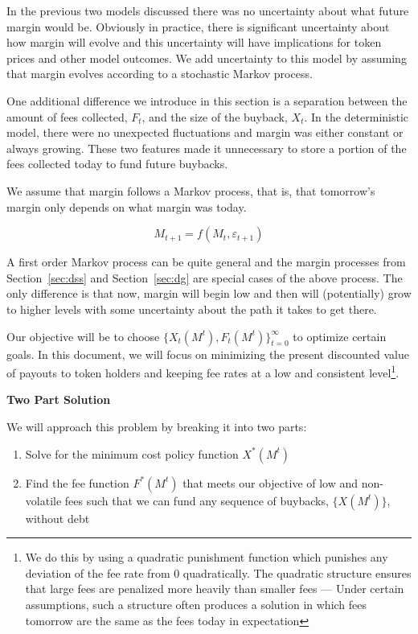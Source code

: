 
In the previous two models discussed there was no uncertainty about what future margin would be.
Obviously in practice, there is significant uncertainty about how margin will evolve and this
uncertainty will have implications for token prices and other model outcomes. We add
uncertainty to this model by assuming that margin evolves according to a stochastic Markov process.

One additional difference we introduce in this section is a separation between the amount of fees
collected, $F_t$, and the size of the buyback, $X_t$. In the deterministic model, there were no
unexpected fluctuations and margin was either constant or always growing. These two features made it
unnecessary to store a portion of the fees collected today to fund future buybacks.

We assume that margin follows a Markov process, that is, that tomorrow's margin only depends on what
margin was today.

$$M_{t+1} = f(M_t, \varepsilon_{t+1})$$

A first order Markov process can be quite general and the margin processes from
Section~\ref{sec:dss}  and Section~\ref{sec:dg} are special cases of the above process. The only
difference is that now, margin will begin low and then will (potentially) grow to higher levels with
some uncertainty about the path it takes to get there.

Our objective will be to choose $\{X_t(M^t), F_t(M^t)\}_{t=0}^{\infty}$ to optimize certain goals.
In this document, we will focus on minimizing the present discounted value of payouts to token
holders and keeping fee rates at a low and consistent level\footnote{We do this by using a quadratic
punishment function which punishes any deviation of the fee rate from 0 quadratically. The quadratic
structure ensures that large fees are penalized more heavily than smaller fees --- Under certain
assumptions, such a structure often produces a solution in which fees tomorrow are the same as the
fees today in expectation}.

\textbf{Two Part Solution}

We will approach this problem by breaking it into two parts:

\begin{enumerate}
  \item Solve for the minimum cost policy function $X^*(M^t)$
  \item Find the fee function $F^*(M^t)$ that meets our objective of low and non-volatile fees such
        that we can fund any sequence of buybacks, $\{X(M^t)\}$, without debt
\end{enumerate}

